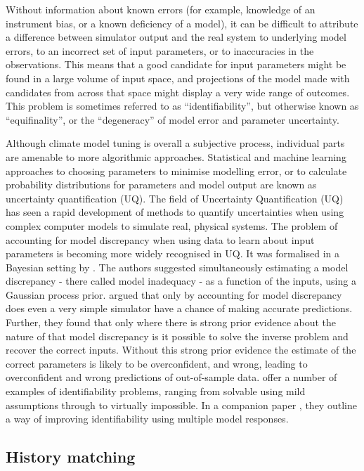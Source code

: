 \documentclass[gmd, manuscript]{copernicus}
\begin{document}
Without information about known errors (for example, knowledge of an instrument bias, or a known deficiency of a model), it can be difficult to attribute a difference between simulator output and the real system to underlying model errors, to an incorrect set of input parameters, or to inaccuracies in the observations. This means that a good candidate for input parameters might be found in a large volume of input space, and projections of the model made with candidates from across that space might display a very wide range of outcomes. This problem is sometimes referred to as ``identifiability'', but otherwise known as ``equifinality'', or the ``degeneracy'' of model error and parameter uncertainty. 

Although climate model tuning is overall a subjective process, individual parts are amenable to more algorithmic approaches. Statistical and machine learning approaches to choosing parameters to minimise modelling error, or to calculate probability distributions for parameters and model output are known as uncertainty quantification (UQ). The field of Uncertainty Quantification (UQ) has seen a rapid development of methods to quantify uncertainties when using complex computer models to simulate real, physical systems. The problem of accounting for model discrepancy when using data to learn about input parameters is becoming more widely recognised in UQ. It was formalised in a Bayesian setting by \cite{kennedy2001bayesian}. The authors suggested simultaneously estimating a model discrepancy  - there called model inadequacy - as a function of the inputs, using a Gaussian process prior. \cite{brynjarsdottir2014learning} argued that only by accounting for model discrepancy does even a very simple simulator have a chance of making accurate predictions. Further, they found that only where there is strong prior evidence about the nature of that model discrepancy is it possible to solve the inverse problem and recover the correct inputs. Without this strong prior evidence the estimate of the correct parameters is likely to be overconfident, and wrong, leading to overconfident and wrong predictions of out-of-sample data. \cite{arendt2012quantification} offer a number of examples of identifiability problems, ranging from solvable using mild assumptions through to virtually impossible. In a companion paper \citep{arendt2012improving}, they outline a way of improving identifiability using multiple model responses. 

\subsection{History matching}
\end{document}
